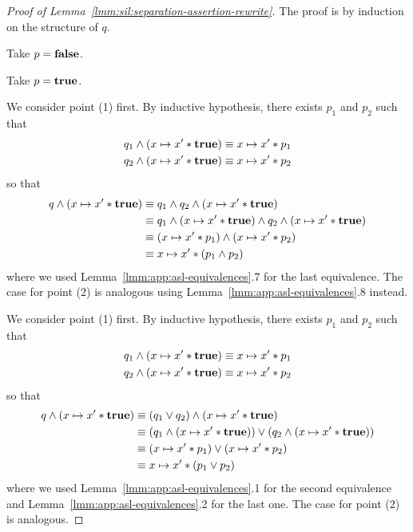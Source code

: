 \begin{proof}[Proof of Lemma~\ref{lmm:sil:separation-assertion-rewrite}]
	The proof is by induction on the structure of $q$.

	Take $p = \textbf{false}$.

	Take $p = \textbf{true}$.

	We consider point (1) first. By inductive hypothesis, there exists $p_1$ and $p_2$ such that
	\begin{align*}
		q_1 \land (x \mapsto x' * \textbf{true}) & \equiv x \mapsto x' * p_1 \\
		q_2 \land (x \mapsto x' * \textbf{true}) & \equiv x \mapsto x' * p_2
	\end{align*}
	so that
	\begin{align*}
		q \land (x \mapsto x' * \textbf{true}) & \equiv q_1 \land q_2 \land (x \mapsto x' * \textbf{true})                                    \\
		                                     & \equiv q_1 \land (x \mapsto x' * \textbf{true}) \land q_2 \land (x \mapsto x' * \textbf{true}) \\
		                                     & \equiv (x \mapsto x' * p_1) \land (x \mapsto x' * p_2)                         \\
		                                     & \equiv x \mapsto x' * (p_1 \land p_2)
	\end{align*}
	where we used Lemma~\ref{lmm:app:asl-equivalences}.7 for the last equivalence.
	The case for point (2) is analogous using Lemma~\ref{lmm:app:asl-equivalences}.8 instead.

	We consider point (1) first. By inductive hypothesis, there exists $p_1$ and $p_2$ such that
	\begin{align*}
		q_1 \land (x \mapsto x' * \textbf{true}) & \equiv x \mapsto x' * p_1 \\
		q_2 \land (x \mapsto x' * \textbf{true}) & \equiv x \mapsto x' * p_2
	\end{align*}
	so that
	\begin{align*}
		q \land (x \mapsto x' * \textbf{true}) & \equiv (q_1 \lor q_2) \land (x \mapsto x' * \textbf{true})                                      \\
		                                     & \equiv (q_1 \land (x \mapsto x' * \textbf{true})) \lor (q_2 \land (x \mapsto x' * \textbf{true})) \\
		                                     & \equiv (x \mapsto x' * p_1) \lor (x \mapsto x' * p_2)                             \\
		                                     & \equiv x \mapsto x' * (p_1 \lor p_2)
	\end{align*}
	where we used Lemma~\ref{lmm:app:asl-equivalences}.1 for the second equivalence and Lemma~\ref{lmm:app:asl-equivalences}.2 for the last one.
	The case for point (2) is analogous.


\end{proof}
